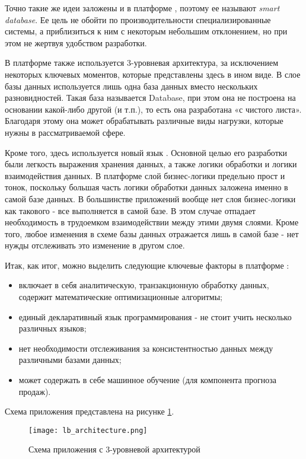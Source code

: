 Точно такие же идеи заложены и в платформе \LB, поэтому ее называют \emph{smart database}. Ее цель не обойти по производительности специализированные системы, а приблизиться к ним с некоторым небольшим отклонением, но при этом не жертвуя удобством разработки.

В платформе \LB также используется 3-уровневая архитектура, за исключением некоторых ключевых моментов, которые представлены здесь в ином виде. В слое базы данных используется лишь одна база данных вместо нескольких разновидностей. Такая база называется \LB Database, при этом она не построена на основании какой-либо другой (\postgres и т.п.), то есть она разработана «с чистого листа». Благодаря этому она может обрабатывать различные виды нагрузки, которые нужны в рассматриваемой сфере.

Кроме того, здесь используется новый язык \logiql. Основной целью его разработки были легкость выражения хранения данных, а также логики обработки и логики взаимодействия данных. В платформе \LB слой бизнес-логики предельно прост и тонок, поскольку большая часть логики обработки данных заложена именно в самой базе данных. В большинстве приложений вообще нет слоя бизнес-логики как такового - все выполняется в самой базе. В этом случае отпадает необходимость в трудоемком взаимодействии между этими двумя слоями. Кроме того, любое изменения в схеме базы данных отражается лишь в самой базе - нет нужды отслеживать это изменение в другом слое.

Итак, как итог, можно выделить следующие ключевые факторы в платформе \LB:

\begin{itemize}
	\item включает в себя аналитическую, транзакционную обработку данных, содержит математические оптимизационные алгоритмы;
	\item единый декларативный язык программирования \logiql - не стоит учить несколько различных языков;
	\item нет необходимости отслеживания за консистентностью данных между различными базами данных;
	\item может содержать в себе машинное обучение (для компонента прогноза продаж).
\end{itemize}

Схема приложения \LB представлена на рисунке \ref{fig:technology:logicblox:lb_architecture}.

\begin{figure}
	\centering
	\texttt{[image: lb\_architecture.png]}
	\caption{Схема приложения \LB с 3-уровневой архитектурой \cite{lb_platform}}
	\label{fig:technology:logicblox:lb_architecture}
\end{figure}

